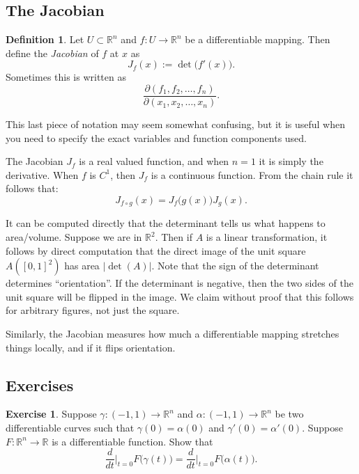 \documentclass[12pt]{book}
\newcommand{\abs}[1]{\left\lvert {#1} \right\rvert}
\newcommand{\R}{{\mathbb{R}}}
\newcommand{\myindex}[1]{#1\index{#1}}
\theoremstyle{plain}
\theoremstyle{remark}
\theoremstyle{definition}
\newtheorem{defn}[thm]{Definition}
\theoremstyle{exercise}
\newtheorem{exercise}{Exercise}[section]
\theoremstyle{example}
\begin{document}
\subsection{The Jacobian}

\begin{defn}
Let $U \subset \R^n$ and
$f \colon U \to \R^n$ be a differentiable mapping.  Then define the
\emph{\myindex{Jacobian}} of $f$ at $x$ as
\begin{equation*}
J_f(x) := \det\bigl( f'(x) \bigr) .
\end{equation*}
Sometimes this is written as
\begin{equation*}
\frac{\partial(f_1,f_2,\ldots,f_n)}{\partial(x_1,x_2,\ldots,x_n)} .
\end{equation*}
\end{defn}

This last piece of notation may seem somewhat confusing,
but it is useful when you need to specify
the exact variables and function components used.

The Jacobian $J_f$ is a real valued function, and when $n=1$ it is simply the
derivative.
When $f$ is $C^1$, then $J_f$ is a continuous function.
From the chain rule it follows that:
\begin{equation*}
J_{f \circ g} (x) = J_f\bigl(g(x)\bigr) J_g(x) .
\end{equation*}

It can be computed directly that the determinant tells us what happens to
area/volume.  Suppose we are in $\R^2$.  Then if $A$ is a linear
transformation, it follows by direct computation that the
direct image of the unit square $A([0,1]^2)$ has area 
$\abs{\det(A)}$.  Note that the sign of the determinant determines
``orientation''.  If the determinant is negative, then the two sides of the
unit square will be flipped in the image.  We claim without proof that
this follows for arbitrary figures, not just the square.

Similarly, the Jacobian measures how much a differentiable mapping stretches
things locally, and if it flips orientation.

\subsection{Exercises}

\begin{exercise}
Suppose $\gamma \colon (-1,1) \to \R^n$ and
$\alpha \colon (-1,1) \to \R^n$ be two differentiable curves
such that $\gamma(0) = \alpha(0)$ and $\gamma'(0) = \alpha'(0)$.
Suppose $F \colon \R^n \to \R$ is a differentiable function.  Show that
\begin{equation*}
\frac{d}{dt}\Big|_{t=0}
F\bigl(\gamma(t)\bigr)
=
\frac{d}{dt}\Big|_{t=0}
F\bigl(\alpha(t)\bigr)
.
\end{equation*}
\end{exercise}
\end{document}
